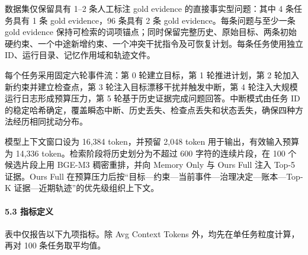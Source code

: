 \documentclass[UTF8,a4paper,12pt]{ctexart}
\begin{document}
数据集仅保留具有 1--2 条人工标注 gold evidence 的直接事实型问题：其中 4 条任务具有 1 条 gold evidence，96 条具有 2 条 gold evidence。每条问题与至少一条 gold evidence 保持可检索的词项锚点；同时保留完整历史、原始目标、两条初始硬约束、一个中途新增约束、一个冲突干扰指令及可恢复计划。每条任务使用独立 ID、运行目录、记忆作用域和轨迹文件。

每个任务采用固定六轮事件流：第 0 轮建立目标，第 1 轮推进计划，第 2 轮加入新约束并建立检查点，第 3 轮注入目标漂移干扰并触发中断，第 4 轮注入大规模运行日志形成预算压力，第 5 轮基于历史证据完成问题回答。中断模式由任务 ID 的稳定哈希确定，覆盖瞬态中断、历史丢失、检查点丢失和状态丢失，确保四种方法经历相同扰动分布。

模型上下文窗口设为 16,384 token，并预留 2,048 token 用于输出，有效输入预算为 14,336 token。检索阶段将历史划分为不超过 600 字符的连续片段，在 100 个候选片段上用 BGE-M3 稠密重排，并向 Memory Only 与 Ours Full 注入 Top-5 证据。Ours Full 在预算压力后按``目标—约束—当前事件—治理决定—账本—Top-K 证据—近期轨迹''的优先级组织上下文。

\paragraph{5.3 指标定义}

表中仅报告以下九项指标。除 Avg Context Tokens 外，均先在单任务粒度计算，再对 100 条任务取平均值。
\end{document}
